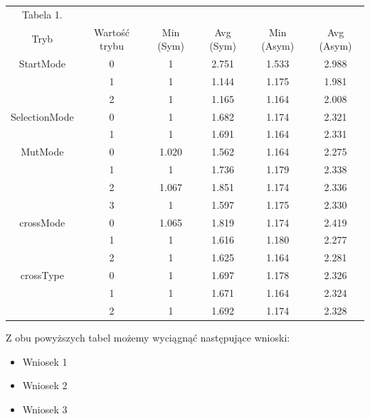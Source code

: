 \documentclass{article}
\begin{document}
\begin{table}[h!]
	\centering
	\begin{tabular}{c|c||c|c||c|c}
Tabela 1. \\
Tryb & Wartość trybu & Min (Sym) & Avg (Sym)  & Min (Asym) & Avg (Asym)\\
\hline
StartMode & 0 & 1 & 2.751 & 1.533 & 2.988\\
 & 1 & 1 & 1.144 & 1.175 & 1.981\\
 & 2 & 1 & 1.165 & 1.164 & 2.008\\
\hline
SelectionMode & 0 & 1 & 1.682 & 1.174 & 2.321\\
 & 1 & 1 & 1.691 & 1.164 & 2.331\\
\hline
MutMode & 0 & 1.020 & 1.562 & 1.164 & 2.275\\
 & 1 & 1 & 1.736 & 1.179 & 2.338\\
 & 2 & 1.067 & 1.851 & 1.174 & 2.336\\
 & 3 & 1 & 1.597 & 1.175 & 2.330\\
\hline
crossMode & 0 & 1.065 & 1.819 & 1.174 & 2.419\\
 & 1 & 1 & 1.616 & 1.180 & 2.277\\
 & 2 & 1 & 1.625 & 1.164 & 2.281\\
\hline
crossType & 0 & 1 & 1.697 & 1.178 & 2.326\\
 & 1 & 1 & 1.671 & 1.164 & 2.324\\
 & 2 & 1 & 1.692 & 1.174 & 2.328\\
	\end{tabular}
\end{table}

Z obu powyższych tabel możemy wyciągnąć następujące wnioski:
\begin{itemize}
	\item Wniosek 1
	\item Wniosek 2
	\item Wniosek 3
\end{itemize}
\end{document}
